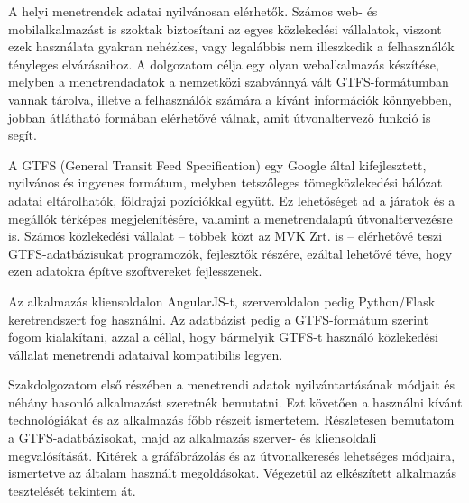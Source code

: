
A helyi menetrendek adatai nyilvánosan elérhetők. Számos web- és mobilalkalmazást is szoktak biztosítani az egyes közlekedési vállalatok, viszont ezek használata gyakran nehézkes, vagy legalábbis nem illeszkedik a felhasználók tényleges elvárásaihoz. A dolgozatom célja egy olyan webalkalmazás készítése, melyben a menetrendadatok a nemzetközi szabvánnyá vált GTFS-formátumban vannak tárolva, illetve a felhasználók számára a kívánt információk könnyebben, jobban átlátható formában elérhetővé válnak, amit útvonaltervező funkció is segít.

A GTFS (General Transit Feed Specification) egy Google által kifejlesztett, nyilvános és ingyenes formátum, melyben tetszőleges tömegközlekedési hálózat adatai eltárolhatók, földrajzi pozíciókkal együtt. Ez lehetőséget ad a járatok és a megállók térképes megjelenítésére, valamint a menetrendalapú útvonaltervezésre is. Számos közlekedési vállalat – többek közt az MVK Zrt. is – elérhetővé teszi GTFS-adatbázisukat programozók, fejlesztők részére, ezáltal lehetővé téve, hogy ezen adatokra építve szoftvereket fejlesszenek.

Az alkalmazás kliensoldalon AngularJS-t, szerveroldalon pedig Python/Flask keretrendszert fog használni. Az adatbázist pedig a GTFS-formátum szerint fogom kialakítani, azzal a céllal, hogy bármelyik GTFS-t használó közlekedési vállalat menetrendi adataival kompatibilis legyen.

Szakdolgozatom első részében a menetrendi adatok nyilvántartásának módjait és néhány hasonló alkalmazást szeretnék bemutatni. Ezt követően a használni kívánt technológiákat és az alkalmazás főbb részeit ismertetem. Részletesen bemutatom a GTFS-adatbázisokat, majd az alkalmazás szerver- és kliensoldali megvalósítását. Kitérek a gráfábrázolás és az útvonalkeresés lehetséges módjaira, ismertetve az általam használt megoldásokat. Végezetül az elkészített alkalmazás tesztelését tekintem át.
